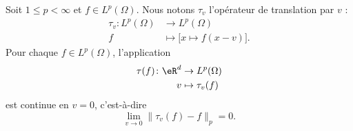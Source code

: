 \begin{lemma}   \label{LemCUlJzkA}
    Soit \( 1\leq p<\infty\) et \( f\in L^p(\Omega)\). Nous notons \( \tau_v\) l'opérateur de translation par \( v\) :
    \begin{equation}
        \begin{aligned}
            \tau_v\colon L^p(\Omega)&\to L^p(\Omega) \\
            f&\mapsto \Big[ x\mapsto f(x-v) \Big].
        \end{aligned}
    \end{equation}
    Pour chaque \( f\in L^p(\Omega)\), l'application
    \begin{equation}
        \begin{aligned}
            \tau(f)\colon \eR^d &\to L^p(\Omega) \\
            v&\mapsto \tau_v(f) 
        \end{aligned}
    \end{equation}
    est continue en \( v=0\), c'est-à-dire
    \begin{equation}
        \lim_{v\to 0}\| \tau_v(f)-f \|_p=0.
    \end{equation}
\end{lemma}

